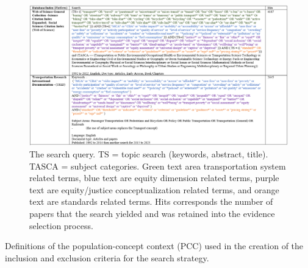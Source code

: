 \documentclass[12pt, oneside]{report}
\begin{document}
\begin{figure}

{\centering \includegraphics[width=4.7in,height=\textheight]{figures/Search-query.png}

}

\caption{\label{fig-A1}The search query. TS = topic search (keywords,
abstract, title). TASCA = subject categories. Green text area
transportation system related terms, blue text are equity dimension
related terms, purple text are equity/justice conceptualization related
terms, and orange text are standards related terms. Hits corresponds the
number of papers that the search yielded and was retained into the
evidence selection process.}

\end{figure}

Definitions of the population-concept context (PCC) used in the creation
of the inclusion and exclusion criteria for the search strategy.
\end{document}
